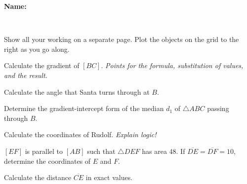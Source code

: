 \documentclass[9pt]{exam}
\begin{document}
\textbf{Name:} \dotfill

\

Show all your working on a separate page. Plot the objects on the grid to the right as you go along.

\vspace{-4mm}

\begin{questions}

\begin{minipage}[t]{0.6\textwidth}


\question[3] Calculate the gradient of $[BC]$. \newline
\emph{Points for the formula, substitution of values, and the result.}


\question[3] Calculate the angle that Santa turns through at $B$.


\question[3] Determine the gradient-intercept form of the median $d_1$ of $\triangle ABC$ passing through $B$.

\question[3] Calculate the coordinates of Rudolf. \hfill \emph{Explain logic!}


\question[3] $[EF]$ is parallel to $[AB]$ such that $\triangle DEF$ has area 48. If $\overline{DE} = \overline{DF} = 10$, determine the coordinates of $E$ and $F$.

\question[3] Calculate the distance $\overline{CE}$ in exact values.

\end{minipage}
\hfill
\begin{minipage}[t]{0.35\textwidth}
\vspace{0mm}

\end{minipage}
\end{questions}
\end{document}
